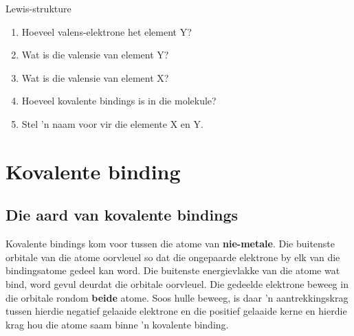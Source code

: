 \begin{exercises}{Lewis-strukture}
{\begin{enumerate}[noitemsep, label=\textbf{\arabic*}. ]
    \setcounter{subfigure}{0}
	\begin{figure}[H] %
\begin{center}
\end{center}
 \end{figure}       \label{m38701*id141181}\begin{enumerate}[noitemsep, label=\textbf{\alph*}. ] 
            \label{m38701*uid39}\item Hoeveel valens-elektrone het element $\text{Y}$?
\label{m38701*uid40}\item Wat is die valensie van element $\text{Y}$?
\label{m38701*uid41}\item Wat is die valensie van element $\text{X}$?
\label{m38701*uid42}\item Hoeveel kovalente bindings is in die molekule?
\label{m38701*uid43}\item Stel  'n naam voor vir die elemente $\text{X}$ en $\text{Y}$.
\end{enumerate}
                \end{enumerate}

}
\end{exercises}


            \section{Kovalente binding}
            \nopagebreak
            \label{m38704*uid6}
            \subsection*{Die aard van kovalente bindings}
            \nopagebreak
        \label{m38704*id138956}
Kovalente bindings kom voor tussen die atome van \textbf{nie-metale}. Die buitenste orbitale van die atome oorvleuel so dat die ongepaarde elektrone by elk van die bindingsatome gedeel kan word. Die buitenste energievlakke van die atome wat bind, word gevul deurdat die orbitale oorvleuel. Die gedeelde elektrone beweeg in die orbitale rondom \textbf{beide} atome. Soos hulle beweeg, is daar  'n aantrekkingskrag tussen hierdie negatief gelaaide elektrone en die positief gelaaide kerne en hierdie krag hou die atome saam binne  'n kovalente binding.\par 

